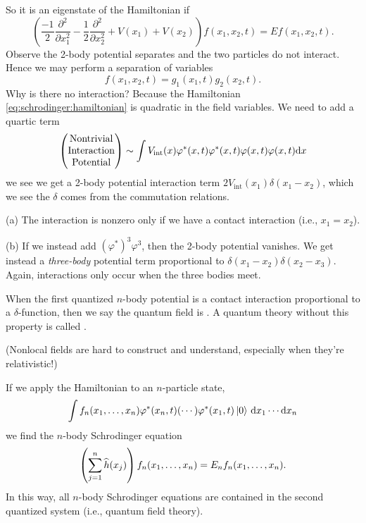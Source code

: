So it is an eigenstate of the Hamiltonian if
\begin{equation}
\left(\frac{-1}{2}\frac{\partial^{2}}{\partial x_{1}^{2}}
-\frac{1}{2}\frac{\partial^{2}}{\partial x_{2}^{2}}
+V(x_{1})+V(x_{2})\right)f(x_{1},x_{2},t) = Ef(x_{1},x_{2},t).
\end{equation}
Observe the 2-body potential separates and the two particles do not
interact. Hence we may perform a separation of variables
\begin{equation}
f(x_{1},x_{2},t)=g_{1}(x_{1},t)g_{2}(x_{2},t).
\end{equation}
Why is there no interaction? Because the Hamiltonian \eqref{eq:schrodinger:hamiltonian}
is quadratic in the field variables. We need to add a quartic term
\begin{equation}
\begin{pmatrix}
\mbox{Nontrivial}\\\mbox{Interaction}\\\mbox{Potential}
\end{pmatrix}
\sim\int V_{\text{int}}(x)\varphi^{*}(x,t)\varphi^{*}(x,t)\varphi(x,t)\varphi(x,t)\mathrm{d}{x}
\end{equation}
we see we get a 2-body potential interaction term
$2V_{\text{int}}(x_{1})\delta(x_{1}-x_{2})$, which we see the $\delta$ comes from
the commutation relations.

 (a) The interaction is nonzero only if we have a contact
interaction (i.e., $x_{1}=x_{2}$).

(b) If we instead add $(\varphi^{*})^{3}\varphi^{3}$, then the 2-body
potential vanishes. We get instead a \emph{three-body} potential term
proportional to $\delta(x_{1}-x_{2})\delta(x_{2}-x_{3})$. Again,
interactions only occur when the three bodies meet.

\begin{definition}
When the first quantized $n$-body potential is a contact
interaction proportional to a $\delta$-function, then we say the quantum
field is . A quantum theory without this property is
called .

(Nonlocal fields are hard to construct and understand, especially when
they're relativistic!)
\end{definition}

If we apply the Hamiltonian to an $n$-particle state,
\begin{equation}
\int f_{n}(x_{1},\dots,x_{n})\varphi^{*}(x_{n},t)(\cdots)\varphi^{*}(x_{1},t)\ket{0}\,\mathrm{d}{x}_{1}
\cdots\mathrm{d}{x}_{n}
\end{equation}
we find the $n$-body Schrodinger equation
\begin{equation}\label{eq:schrodinger:n-body-hamiltonian}
\left(\sum^{n}_{j=1}\widehat{h}(x_{j})\right)f_{n}(x_{1},\dots,x_{n})=E_{n}f_{n}(x_{1},\dots,x_{n}).
\end{equation}
In this way, all $n$-body Schrodinger equations are contained in the
second quantized system (i.e., quantum field theory).

